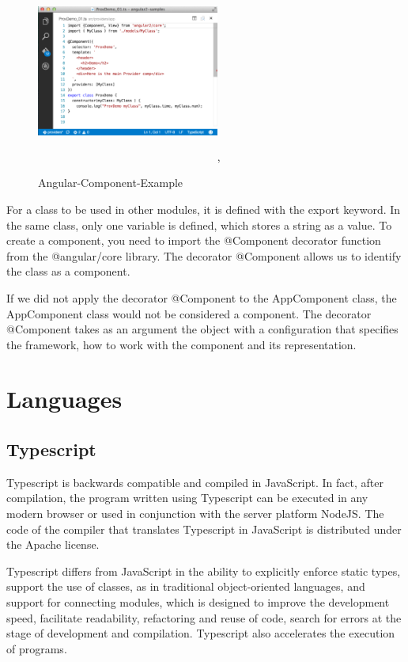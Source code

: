 \documentclass[12pt,a4paper,oneside,openany]{book}
\begin{document}
\begin{figure}[ht]
\renewcommand\thefigure{4.4}
\centering
\includegraphics[width=6cm, height=6cm]{Images/angular.png},
\caption{Angular-Component-Example}
\label{angular}
\end{figure} 
\newpage
For a class to be used in other modules, it is defined with the export keyword. In the same class, only one variable is defined, which stores a string as a value. To create a component, you need to import the @Component decorator
function from the @angular/core library. The decorator @Component allows us to identify the class as a component.

If we did not apply the decorator @Component to the AppComponent class, the AppComponent class would not be considered a component.
The decorator @Component takes as an argument the object with a configuration that specifies the framework, how to work with the component and its representation.

\section{Languages}
\subsection{Typescript}
Typescript is backwards compatible and compiled in JavaScript. In fact, after compilation, the program written using Typescript can be executed in any modern browser or used in conjunction with the server platform NodeJS.
The code of the compiler that translates Typescript in JavaScript is distributed under the Apache license.

Typescript differs from JavaScript in the ability to explicitly enforce static types, support the use of classes, as in traditional object-oriented languages, and support for connecting modules, which is designed to improve the development speed, facilitate readability, refactoring and reuse of code, search for errors at the stage of development and compilation. Typescript also accelerates the execution of programs. \cite{TS}
\end{document}
